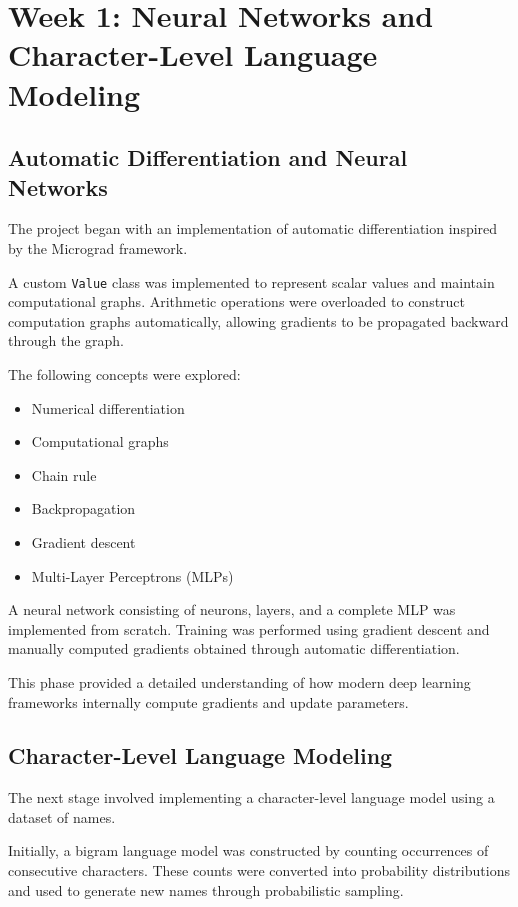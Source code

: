 \documentclass[11pt,a4paper]{article}
\begin{document}
\section{Week 1: Neural Networks and Character-Level Language Modeling}

\subsection{Automatic Differentiation and Neural Networks}

The project began with an implementation of automatic differentiation inspired by the Micrograd framework.

A custom \texttt{Value} class was implemented to represent scalar values and maintain computational graphs. Arithmetic operations were overloaded to construct computation graphs automatically, allowing gradients to be propagated backward through the graph.

The following concepts were explored:

\begin{itemize}
    \item Numerical differentiation
    \item Computational graphs
    \item Chain rule
    \item Backpropagation
    \item Gradient descent
    \item Multi-Layer Perceptrons (MLPs)
\end{itemize}

A neural network consisting of neurons, layers, and a complete MLP was implemented from scratch. Training was performed using gradient descent and manually computed gradients obtained through automatic differentiation.

This phase provided a detailed understanding of how modern deep learning frameworks internally compute gradients and update parameters.

\subsection{Character-Level Language Modeling}

The next stage involved implementing a character-level language model using a dataset of names.

Initially, a bigram language model was constructed by counting occurrences of consecutive characters. These counts were converted into probability distributions and used to generate new names through probabilistic sampling.
\end{document}
